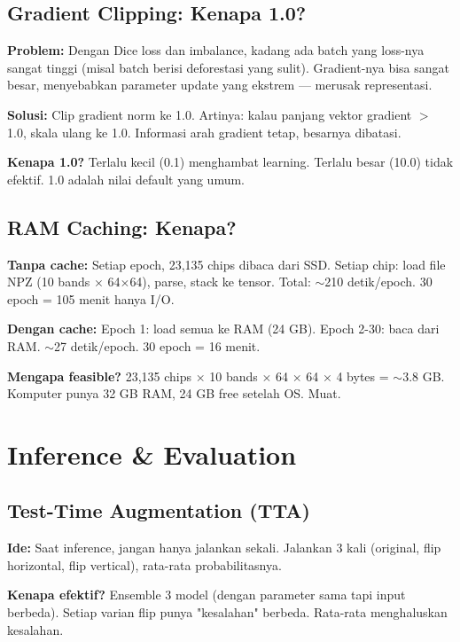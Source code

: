 \documentclass[10pt,a4paper,onecolumn]{article}
\begin{document}
\subsection{Gradient Clipping: Kenapa 1.0?}

\textbf{Problem:} Dengan Dice loss dan imbalance, kadang ada batch
yang loss-nya sangat tinggi (misal batch berisi deforestasi yang
sulit). Gradient-nya bisa sangat besar, menyebabkan parameter update
yang ekstrem — merusak representasi.

\textbf{Solusi:} Clip gradient norm ke 1.0. Artinya: kalau panjang
vektor gradient $>$ 1.0, skala ulang ke 1.0. Informasi arah gradient
tetap, besarnya dibatasi.

\textbf{Kenapa 1.0?} Terlalu kecil (0.1) menghambat learning.
Terlalu besar (10.0) tidak efektif. 1.0 adalah nilai default yang
umum.

\subsection{RAM Caching: Kenapa?}

\textbf{Tanpa cache:} Setiap epoch, 23,135 chips dibaca dari SSD.
Setiap chip: load file NPZ (10 bands $\times$ 64$\times$64), parse,
stack ke tensor. Total: $\sim$210 detik/epoch. 30 epoch = 105 menit
hanya I/O.

\textbf{Dengan cache:} Epoch 1: load semua ke RAM (24 GB). Epoch
2-30: baca dari RAM. $\sim$27 detik/epoch. 30 epoch = 16 menit.

\textbf{Mengapa feasible?} 23,135 chips $\times$ 10 bands $\times$
64 $\times$ 64 $\times$ 4 bytes = $\sim$3.8 GB. Komputer punya 32 GB
RAM, 24 GB free setelah OS. Muat.

\section{Inference \& Evaluation}

\subsection{Test-Time Augmentation (TTA)}

\textbf{Ide:} Saat inference, jangan hanya jalankan sekali. Jalankan
3 kali (original, flip horizontal, flip vertical), rata-rata
probabilitasnya.

\textbf{Kenapa efektif?} Ensemble 3 model (dengan parameter sama
tapi input berbeda). Setiap varian flip punya "kesalahan" berbeda.
Rata-rata menghaluskan kesalahan.
\end{document}

